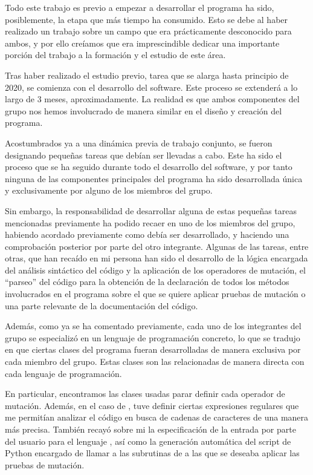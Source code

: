 Todo este trabajo es previo a empezar a desarrollar el programa ha sido, posiblemente, la etapa que más tiempo ha consumido. Esto se debe al haber realizado un trabajo sobre un campo que era prácticamente desconocido para ambos, y por ello creíamos que era imprescindible dedicar una importante porción del trabajo a la formación y el estudio de este área.

Tras haber realizado el estudio previo, tarea que se alarga hasta principio de 2020, se comienza con el desarrollo del software. Este proceso se extenderá a lo largo de 3 meses, aproximadamente. La realidad es que ambos componentes del grupo nos hemos involucrado de manera similar en el diseño y creación del programa.

Acostumbrados ya a una dinámica previa de trabajo conjunto, se fueron designando pequeñas tareas que debían ser llevadas a cabo. Este ha sido el proceso que se ha seguido durante todo el desarrollo del software, y por tanto ninguna de las componentes principales del programa ha sido desarrollada única y exclusivamente por alguno de los miembros del grupo.

Sin embargo, la responsabilidad de desarrollar alguna de estas pequeñas tareas mencionadas previamente ha podido recaer en uno de los miembros del grupo, habiendo acordado previamente como debía ser desarrollado, y haciendo una comprobación posterior por parte del otro integrante. Algunas de las tareas, entre otras, que han recaído en mi persona han sido el desarrollo de la lógica encargada del análisis sintáctico del código y la aplicación de los operadores de mutación, el ``parseo'' del código para la obtención de la declaración de todos los métodos involucrados en el programa sobre el que se quiere aplicar pruebas de mutación o una parte relevante de la documentación del código. 

Además, como ya se ha comentado previamente, cada uno de los integrantes del grupo se especializó en un lenguaje de programación concreto, lo que se tradujo en que ciertas clases del programa fueran desarrolladas de manera exclusiva por cada miembro del grupo. Estas clases son las relacionadas de manera directa con cada lenguaje de programación. 

En particular, encontramos las clases usadas parar definir cada operador de mutación. Además, en el caso de \qsh, tuve definir ciertas expresiones regulares que me permitían analizar el código en busca de cadenas de caracteres de una manera más precisa. También recayó sobre mi la especificación de la entrada por parte del usuario para el lenguaje \qsh, así como la generación automática del script de Python encargado de llamar a las subrutinas de \qsh a las que se deseaba aplicar las pruebas de mutación.

